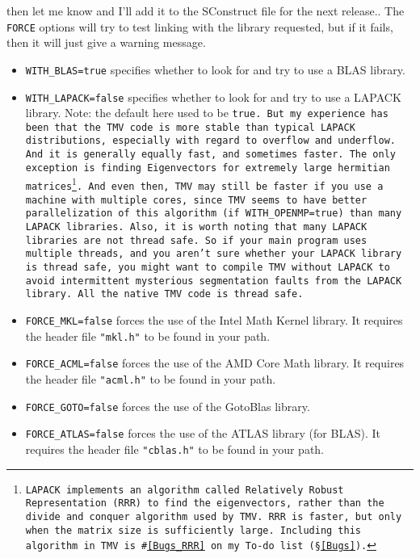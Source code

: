 \begin{enumerate}
{then let me know and I'll add it to the SConstruct file for the next release.}.
The \texttt{FORCE} options will try to test linking with the library requested,
but if it fails, then it will just give a warning message.
\begin{itemize}
\item \texttt{WITH\_BLAS=true} specifies whether to look for and try to use a BLAS library.
\item \texttt{WITH\_LAPACK=false} specifies whether to look for and try to use a LAPACK library.
Note: the default here used to be \tt{true}.  But my experience has been that the TMV code
is more stable than typical LAPACK distributions, especially with regard to overflow and 
underflow.  And it is generally equally fast, and sometimes faster.  The only exception is 
finding Eigenvectors for extremely large hermitian matrices\footnote{
LAPACK implements an algorithm called Relatively Robust Representation (RRR) to 
find the eigenvectors, rather than the divide and conquer algorithm used by TMV.
RRR is faster, but only when the matrix size is sufficiently large.  Including this algorithm 
in TMV is \#\ref{Bugs_RRR} on my To-do list (\S\ref{Bugs}).
}.  And even then, TMV may still be faster 
if you use a machine with multiple 
cores, since TMV seems to have better parallelization of this algorithm
 (if \tt{WITH_OPENMP=true}) than many LAPACK libraries.
Also, it is worth noting that many LAPACK libraries are not thread safe.
So if your main program uses multiple threads, and you aren't sure whether
your LAPACK library is thread safe, you might want to compile TMV without 
LAPACK to avoid intermittent mysterious segmentation faults from the
LAPACK library.  All the native TMV code is thread safe.
\item \texttt{FORCE\_MKL=false} forces the use of the Intel Math Kernel library. 
It requires the header file \texttt{"mkl.h"} to be found in your path. 
\item \texttt{FORCE\_ACML=false} forces the use of the AMD Core Math library.  
It requires the header file \texttt{"acml.h"} to be found in your path.
\item \texttt{FORCE\_GOTO=false} forces the use of the GotoBlas library.  
\item \texttt{FORCE\_ATLAS=false} forces the use of the ATLAS library (for BLAS).  
It requires the header file \texttt{"cblas.h"} to be found in your path.

\end{itemize}
\end{enumerate}
